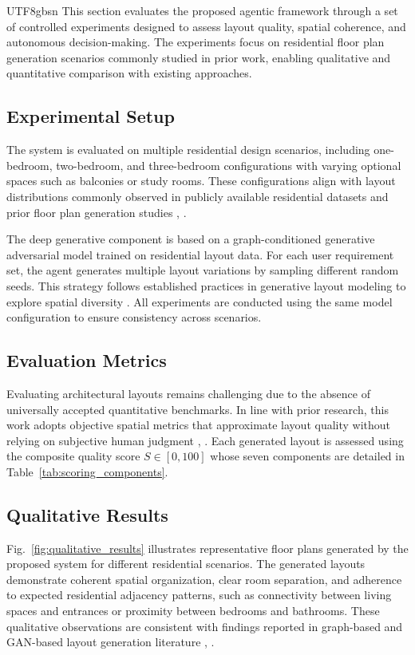 \documentclass[11pt]{article}
\let\cite\citep
\providecommand\citep{\cite}
\begin{document}
\begin{CJK}{UTF8}{gbsn}
This section evaluates the proposed agentic framework through a set of controlled experiments designed to assess layout quality, spatial coherence, and autonomous decision-making. The experiments focus on residential floor plan generation scenarios commonly studied in prior work, enabling qualitative and quantitative comparison with existing approaches.

\subsection*{Experimental Setup}

The system is evaluated on multiple residential design scenarios, including one-bedroom, two-bedroom, and three-bedroom configurations with varying optional spaces such as balconies or study rooms. These configurations align with layout distributions commonly observed in publicly available residential datasets and prior floor plan generation studies \cite{b18}, \cite{b16}. 

The deep generative component is based on a graph-conditioned generative adversarial model trained on residential layout data. For each user requirement set, the agent generates multiple layout variations by sampling different random seeds. This strategy follows established practices in generative layout modeling to explore spatial diversity \cite{b17}. All experiments are conducted using the same model configuration to ensure consistency across scenarios.

\subsection*{Evaluation Metrics}

Evaluating architectural layouts remains challenging due to the absence of universally accepted quantitative benchmarks. In line with prior research, this work adopts objective spatial metrics that approximate layout quality without relying on subjective human judgment \cite{b16}, \cite{b19}. Each generated layout is assessed using the composite quality score $S \in [0,100]$ whose seven components are detailed in Table~\ref{tab:scoring_components}.

\subsection*{Qualitative Results}

Fig.~\ref{fig:qualitative_results} illustrates representative floor plans generated by the proposed system for different residential scenarios. The generated layouts demonstrate coherent spatial organization, clear room separation, and adherence to expected residential adjacency patterns, such as connectivity between living spaces and entrances or proximity between bedrooms and bathrooms. These qualitative observations are consistent with findings reported in graph-based and GAN-based layout generation literature \cite{b16}, \cite{b19}.


\end{CJK}
\end{document}
